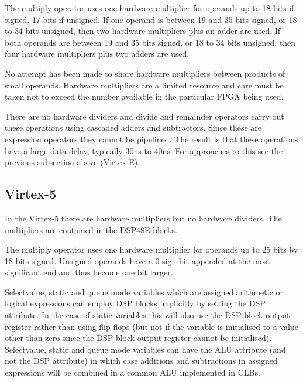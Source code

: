             The multiply operator uses one hardware multiplier for operands up
            to 18 bits if signed, 17 bits if unsigned. If one operand is between
            19 and 35 bits signed, or 18 to 34 bits unsigned, then two hardware
            multipliers plus an adder are used. If both operands are between 19
            and 35 bits signed, or 18 to 34 bits unsigned, then four hardware
            multipliers plus two adders are used.
            
            No attempt has been made to share hardware multipliers between
            products of small operands. Hardware multipliers are a limited
            resource and care must be taken not to exceed the number available
            in the particular FPGA being used.
                       
            There are no hardware dividers and divide and remainder operators
            carry out these operations using cascaded adders and subtractors.
            Since these are expression operators they cannot be pipelined. The
            result is that these operations have a large data delay, typically
            30ns to 40ns. For approaches to this see the previous subsection
            above (Virtex-E).
    
        \subsection{Virtex-5}

            In the Virtex-5 there are hardware multipliers but no hardware
            dividers. The multipliers are contained in the DSP48E blocks.

            The multiply operator uses one hardware multiplier for operands up
            to 25 bits by 18 bits signed. Unsigned operands have a 0 sign bit
            appended at the most significant end and thus become one bit
            larger.
            
            Selectvalue, static and queue mode variables which are assigned
            arithmetic or logical expressions can employ DSP blocks implicitly
            by setting the DSP attribute. In the case of static variables this
            will also use the DSP block output register rather than using
            flip-flops (but not if the variable is initialised to a value other
            than zero since the DSP block output register cannot be
            initialised). Selectvalue, static and queue mode variables can
            have the ALU attribute (and not the DSP attribute) in which case
            additions and subtractions in assigned expressions will be
            combined in a common ALU implemented in CLBs.
            

